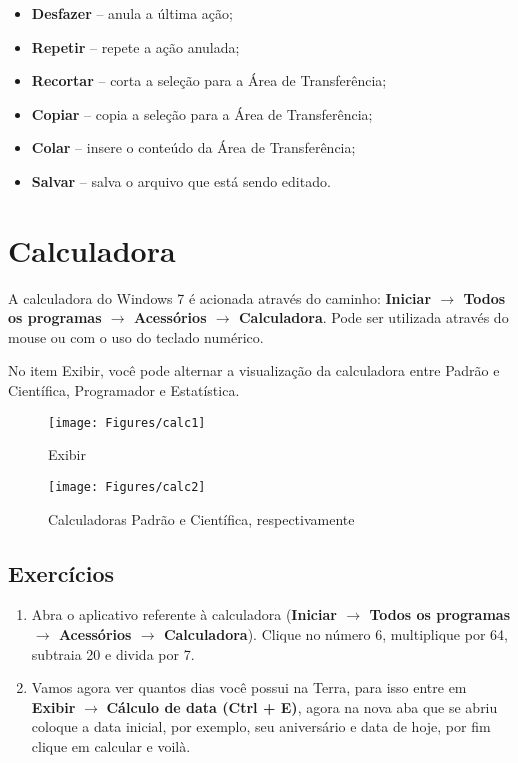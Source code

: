 \documentclass[hidelinks,12pt]{article}
\begin{document}
			\begin{itemize}
				\item {\bf Desfazer} – anula a última ação;

				\item {\bf Repetir} – repete a ação anulada;

				\item {\bf Recortar} – corta a seleção para a Área de Transferência;

				\item {\bf Copiar} – copia a seleção para a Área de Transferência;

				\item {\bf Colar} – insere o conteúdo da Área de Transferência;

				\item {\bf Salvar} – salva o arquivo que está sendo editado.
			\end{itemize}

			\section{Calculadora}

			A calculadora do Windows 7 é acionada através do caminho: {\bf Iniciar $\rightarrow$ Todos os programas $\rightarrow$ Acessórios $\rightarrow$ Calculadora}. Pode ser utilizada através do mouse ou com o uso do teclado numérico.

			No item Exibir, você pode alternar a visualização da calculadora entre Padrão e Científica, Programador e Estatística.

			\begin{figure}[!h]
				\centering
				\texttt{[image: Figures/calc1]}
				\label{fig:calc1}
				\caption{Exibir}
			\end{figure}

			\begin{figure}[!h]
				\centering
				\texttt{[image: Figures/calc2]}
				\label{fig:calc2}
				\caption{Calculadoras Padrão e Científica, respectivamente}
			\end{figure}

		\subsection{Exercícios}

		\begin{enumerate}
			\item Abra o aplicativo referente à calculadora ({\bf Iniciar $\rightarrow$ Todos os programas $\rightarrow$ Acessórios $\rightarrow$ Calculadora}). Clique no número 6, multiplique por 64, subtraia 20 e divida por 7.

			\item Vamos agora ver quantos dias você possui na Terra, para isso entre em \textbf{Exibir} $\rightarrow$ \textbf{Cálculo de data (Ctrl + E)}, agora na nova aba que se abriu coloque a data inicial, por exemplo, seu aniversário e data de hoje, por fim clique em calcular e voilà.
		\end{enumerate}
\end{document}
